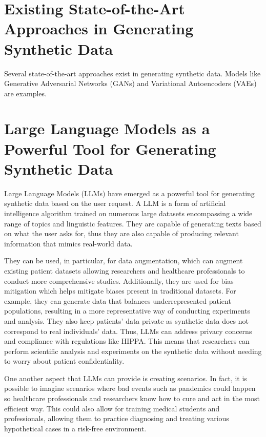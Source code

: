 \section{Existing State-of-the-Art Approaches in Generating Synthetic Data}
\label{sec:ExistingStateOfTheArtApproaches}

Several state-of-the-art approaches exist in generating synthetic data. Models like Generative Adversarial Networks (GANs) and Variational Autoencoders (VAEs) are examples.



\section{Large Language Models as a Powerful Tool for Generating Synthetic Data}
\label{sec:IntroductionLLMs}

Large Language Models (LLMs) have emerged as a powerful tool for generating synthetic data based on the user request. A LLM is a form of artificial intelligence algorithm trained on numerous large datasets encompassing a wide range of topics and linguistic features. They are capable of generating texts based on what the user asks for, thus they are also capable of producing relevant information that mimics real-world data. 

\vspace{0.5cm}
They can be used, in particular, for data augmentation, which can augment existing patient datasets allowing researchers and healthcare professionals to conduct more comprehensive studies.
Additionally, they are used for bias mitigation which helps mitigate biases present in traditional datasets. For example, they can generate data that balances underrepresented patient populations, resulting in a more representative way of conducting experiments and analysis.
They also keep patients' data private as synthetic data does not correspond to real individuals' data. Thus, LLMs can address privacy concerns and compliance with regulations like HIPPA. This means that researchers can perform scientific analysis and experiments on the synthetic data without needing to worry about patient confidentiality.

One another aspect that LLMs can provide is creating scenarios. In fact, it is possible to imagine scenarios where bad events such as pandemics could happen so healthcare professionals and researchers know how to cure and act in the most efficient way. This could also allow for training medical students and professionals, allowing them to practice diagnosing and treating various hypothetical cases in a risk-free environment.



